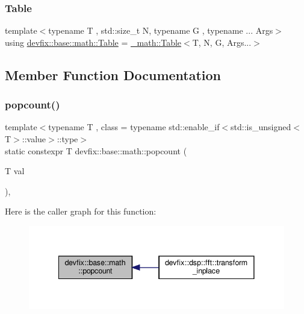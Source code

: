 \subsubsection{\texorpdfstring{Table}{Table}}
{\footnotesize\ttfamily template$<$typename T , std\+::size\+\_\+t N, typename G , typename ... Args$>$ \\
using \hyperlink{structdevfix_1_1base_1_1math_a6f2114ac2cf825b518cf5fefa00af6e3}{devfix\+::base\+::math\+::\+Table} =  \hyperlink{structdevfix_1_1base_1_1__math_1_1Table}{\+\_\+math\+::\+Table}$<$T, N, G, Args...$>$}



\subsection{Member Function Documentation}
\mbox{\label{structdevfix_1_1base_1_1math_a43815037f45e01d90a6c0cb0e1d8ef11}} 
\subsubsection{\texorpdfstring{popcount()}{popcount()}}
{\footnotesize\ttfamily template$<$typename T , class  = typename std\+::enable\+\_\+if$<$std\+::is\+\_\+unsigned$<$\+T$>$\+::value$>$\+::type$>$ \\
static constexpr T devfix\+::base\+::math\+::popcount (\begin{DoxyParamCaption}\item[{T}]{val }\end{DoxyParamCaption})\hspace{0.3cm}{\ttfamily [inline]}, {\ttfamily [static]}}

Here is the caller graph for this function\+:\nopagebreak
\begin{figure}[H]
\begin{center}
\leavevmode
\includegraphics[width=341pt]{structdevfix_1_1base_1_1math_a43815037f45e01d90a6c0cb0e1d8ef11_icgraph}
\end{center}
\end{figure}
\mbox{\label{structdevfix_1_1base_1_1math_af3260ac1a62b3e9f6feb0f212aa8f796}} 
